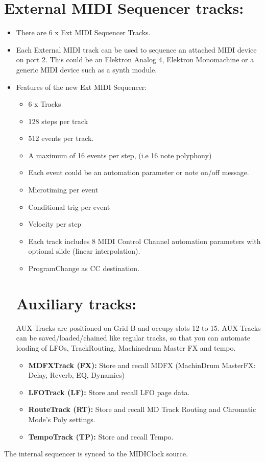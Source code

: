 \section{External MIDI Sequencer tracks:}
\begin{itemize}
\item There are 6 x Ext MIDI Sequencer Tracks.
\item Each External MIDI track can be used to sequence an attached MIDI device on port 2. This could be an Elektron Analog 4, Elektron Monomachine or a generic MIDI device such as a synth module.
\item
    Features of the new Ext MIDI Sequencer:
\begin{itemize}
    \item 6 x Tracks
    \item 128 steps per track
	\item 512 events per track.
    \item A maximum of 16 events per step, (i.e 16 note polyphony)
	\item Each event could be an automation parameter or note on/off message.
    \item Microtiming per event
    \item Conditional trig per event
    \item Velocity per step
    \item Each track includes 8 MIDI Control Channel automation parameters with optional slide (linear interpolation).
    \item ProgramChange as CC destination.
\end{itemize}

\section{Auxiliary tracks:}
 AUX Tracks are positioned on Grid B and occupy slots 12 to 15.
  AUX Tracks can be saved/loaded/chained like regular tracks, so that you can automate loading of LFOs, TrackRouting, Machinedrum Master FX and tempo.
 \begin{itemize}
 \item \textbf{MDFXTrack (FX):} Store and recall MDFX (MachinDrum MasterFX: Delay, Reverb, EQ, Dynamics)
 \item \textbf{LFOTrack (LF):} Store and recall LFO page data.
 \item \textbf{RouteTrack (RT):} Store and recall MD Track Routing and Chromatic Mode's Poly settings.
 \item \textbf{TempoTrack (TP):} Store and recall Tempo.

 
    \end{itemize}
\end{itemize}
The internal sequencer is synced to the MIDIClock source.
\\
